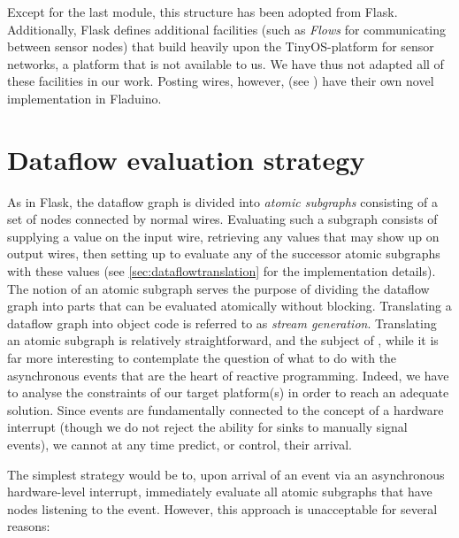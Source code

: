 \documentclass[a4paper, oneside, final]{memoir}
\let\Fref\undefined
\begin{document}
Except for the last module, this structure has been adopted from
Flask.  Additionally, Flask defines additional facilities (such as
\textit{Flows} for communicating between sensor nodes) that build
heavily upon the TinyOS-platform for sensor networks, a platform that
is not available to us.  We have thus not adapted all of these
facilities in our work.  Posting wires, however, (see
\Fref{sec:posting wires}) have their own novel implementation in
Fladuino.

\section{Dataflow evaluation strategy}
\label{sec:dataflowevaluationstrategy}
As in Flask, the dataflow graph is divided into \textit{atomic
  subgraphs} consisting of a set of nodes connected by normal wires.
Evaluating such a subgraph consists of supplying a value on the input
wire, retrieving any values that may show up on output wires, then
setting up to evaluate any of the successor atomic subgraphs with
these values (see \ref{sec:dataflowtranslation} for the implementation
details).  The notion of an atomic subgraph serves the purpose of
dividing the dataflow graph into parts that can be evaluated
atomically without blocking.  Translating a dataflow graph into object
code is referred to as \textit{stream generation}.  Translating an
atomic subgraph is relatively straightforward, and the subject of
\Fref{sec:dataflowtranslation}, while it is far more interesting to
contemplate the question of what to do with the asynchronous events
that are the heart of reactive programming.  Indeed, we have to
analyse the constraints of our target platform(s) in order to reach an
adequate solution.  Since events are fundamentally connected to the
concept of a hardware interrupt (though we do not reject the ability
for sinks to manually signal
events), we cannot at any time predict, or control, their arrival.

The simplest strategy would be to, upon arrival of an event via an
asynchronous hardware-level interrupt, immediately evaluate all atomic
subgraphs that have nodes listening to the event.  However, this
approach is unacceptable for several reasons:
\end{document}
